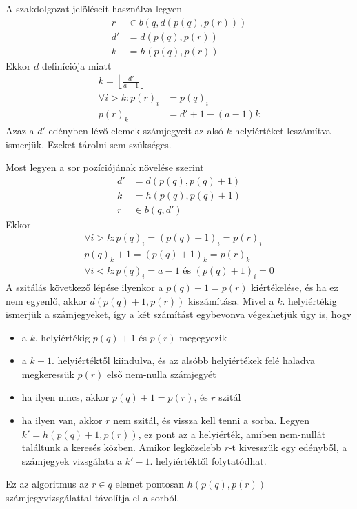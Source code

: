 \documentclass{article}
\begin{document}
A szakdolgozat jelöléseit használva legyen
\begin{align*}
r &\in b(q, d(p(q), p(r))) \\
d' &= d(p(q), p(r)) \\
k &= h(p(q), p(r))
\end{align*}
Ekkor $d$ definíciója miatt
\begin{align*}
k = \left\lfloor \frac{d'}{a-1} \right\rfloor \\
\forall i > k: p(r)_i &= p(q)_i \\
p(r)_k &= d'+1-(a-1)k
\end{align*}
Azaz a $d'$ edényben lévő elemek számjegyeit az alsó $k$ helyiértéket leszámítva ismerjük.
Ezeket tárolni sem szükséges.

Most legyen a sor pozíciójának növelése szerint
\begin{align*}
d' &= d(p(q), p(q)+1) \\
k &= h(p(q), p(q)+1) \\
r &\in b(q, d')
\end{align*}
Ekkor
\begin{align*}
\forall i > k: p(q)_i = (p(q)+1)_i = p(r)_i \\
p(q)_k + 1 = (p(q)+1)_k = p(r)_k \\
\forall i < k: p(q)_i = a-1 \textrm{ és } (p(q)+1)_i = 0
\end{align*}
A szitálás következő lépése ilyenkor a $p(q)+1=p(r)$ kiértékelése, és ha ez nem egyenlő, akkor $d(p(q)+1, p(r))$ kiszámítása.
Mivel a $k$. helyiértékig ismerjük a számjegyeket, így a két számítást egybevonva végezhetjük úgy is, hogy
\begin{itemize}
\item a $k$. helyiértékig $p(q)+1$ és $p(r)$ megegyezik

\item a $k-1$. helyiértéktől kiindulva, és az alsóbb helyiértékek felé haladva megkeressük $p(r)$ első nem-nulla számjegyét
\item ha ilyen nincs, akkor $p(q)+1=p(r)$, és $r$ szitál
\item ha ilyen van, akkor $r$ nem szitál, és vissza kell tenni a sorba.
Legyen $k'=h(p(q)+1, p(r))$, ez pont az a helyiérték, amiben nem-nullát találtunk a keresés közben.
Amikor legközelebb $r$-t kivesszük egy edényből, a számjegyek vizsgálata a $k'-1$. helyiértéktől folytatódhat.
\end{itemize}

Ez az algoritmus az $r \in q$ elemet pontosan $h(p(q), p(r))$ számjegyvizsgálattal távolítja el a sorból.
\end{document}
